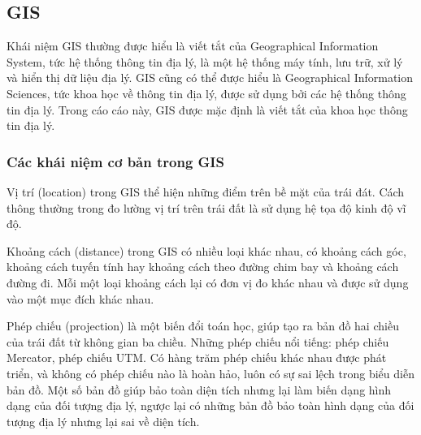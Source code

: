 \documentclass[14pt, oneside, a4paper, openany]{scrartcl}
\begin{document}
%
%
\subsection{GIS}
Khái niệm GIS thường được hiểu là viết tắt của Geographical Information System, tức hệ thống thông tin địa lý, là một hệ thống máy tính, lưu trữ, xử lý và hiển thị dữ liệu địa lý.
GIS cũng có thể được hiểu là Geographical Information Sciences, tức khoa học về thông tin địa lý, được sử dụng bởi các hệ thống thông tin địa lý. Trong cáo cáo này, GIS được mặc định là viết tắt của khoa học thông tin địa lý.
\subsubsection{Các khái niệm cơ bản trong GIS}
Vị trí (location) trong GIS thể hiện những điểm trên bề mặt của trái đát. Cách thông thường trong đo lường vị trí trên trái đất là sử dụng hệ tọa độ kinh độ vĩ độ.

Khoảng cách (distance) trong GIS có nhiều loại khác nhau, có khoảng cách góc, khoảng cách tuyến tính hay khoảng cách theo đường chim bay và khoảng cách đường đi. Mỗi một loại khoảng cách lại có đơn vị đo khác nhau và được sử dụng vào một mục đích khác nhau.

Phép chiếu (projection) là một biến đổi toán học, giúp tạo ra bản đồ hai chiều của trái đất từ không gian ba chiều. Những phép chiếu nổi tiếng: phép chiếu Mercator, phép chiếu UTM.
Có hàng trăm phép chiếu khác nhau được phát triển, và không có phép chiếu nào là hoàn hảo, luôn có sự sai lệch trong biểu diễn bản đồ. Một số bản đồ giúp bảo toàn diện tích nhưng lại làm biến dạng hình dạng của đối tượng địa lý, ngược lại có những bản đồ bảo toàn hình dạng của đối tượng địa lý nhưng lại sai về diện tích.
\end{document}

